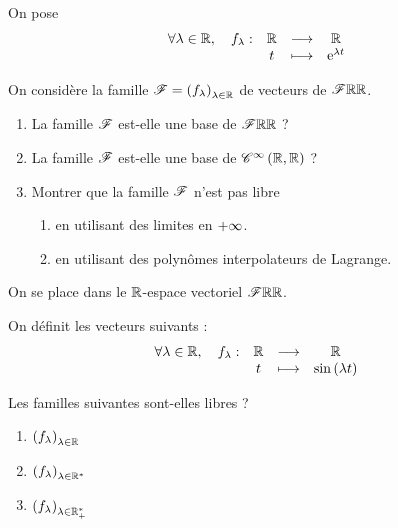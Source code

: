 \begin{corr}
\end{corr}

\begin{exo}[Exercice 16]
On pose \[\quantifs{\forall\lambda\in\R}\fonction{f_\lambda}{\R}{\R}{t}{\e{\lambda t}}\]

On considère la famille \(\mathscr{F}=\left(f_\lambda\right)_{\lambda\in\mathbb{R}}\) de vecteurs de \(\mathscr{F}{\mathbb{R}}{\mathbb{R}}\).

\begin{enumerate}
\item La famille \(\mathscr{F}\) est-elle une base de \(\mathscr{F}{\mathbb{R}}{\mathbb{R}}\) ? \\

\item La famille \(\mathscr{F}\) est-elle une base de \(\mathscr{C}^{\infty}\left(\mathbb{R},\mathbb{R}\right)\) ? \\

\item Montrer que la famille \(\mathscr{F}\) n'est pas libre

\begin{enumerate}
\item en utilisant des limites en \(+\infty\). \\

\item en utilisant des polynômes interpolateurs de Lagrange.
\end{enumerate}
\end{enumerate}
\end{exo}

\begin{corr}
\end{corr}

\begin{exo}[Exercice 17]
On se place dans le \(\mathbb{R}\)-espace vectoriel \(\mathscr{F}{\mathbb{R}}{\mathbb{R}}\).

On définit les vecteurs suivants : \[\quantifs{\forall\lambda\in\R}\fonction{f_\lambda}{\R}{\R}{t}{\sin\paren{\lambda t}}\]

Les familles suivantes sont-elles libres ?

\begin{enumerate}
\item \(\left(f_\lambda\right)_{\lambda\in\mathbb{R}}\) \\

\item \(\left(f_\lambda\right)_{\lambda\in\mathbb{R}^*}\) \\

\item \(\left(f_\lambda\right)_{\lambda\in\mathbb{R}_+^*}\)
\end{enumerate}
\end{exo}

